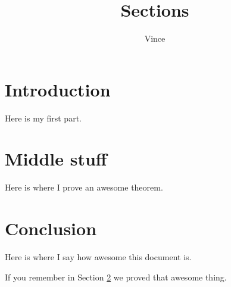 \documentclass{article}
\title{Sections}
\author{Vince}
\begin{document}
\maketitle

\section{Introduction}

Here is my first part.

\section{Middle stuff}\label{middle}

Here is where I prove an awesome theorem.

\section{Conclusion}

Here is where I say how awesome this document is.

If you remember in Section \ref{middle} we proved that awesome thing.
\end{document}
